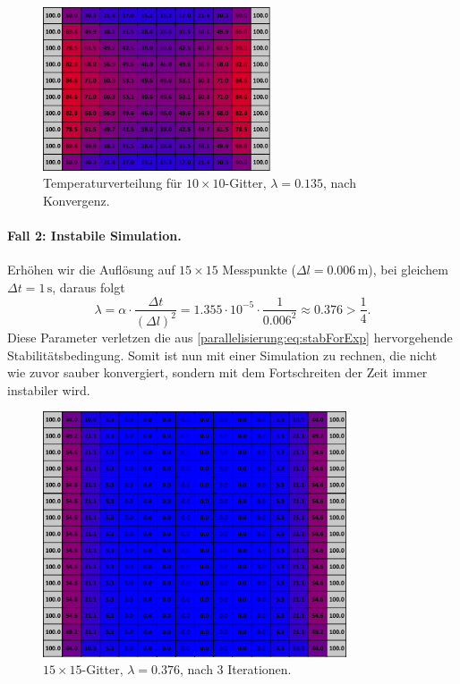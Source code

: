\begin{figure}[htbp]
	\centering
	\includegraphics[width=0.6\textwidth]{papers/parallelisierung/images/simulation_10x10_0.135.pdf}
	\caption{Temperaturverteilung für \(10\times 10\)-Gitter, \(\lambda = 0.135\), nach Konvergenz.}
	\label{parallelisierung:fig:simulation_10x10_0.135}
\end{figure}

\paragraph{Fall 2: Instabile Simulation.}  
Erhöhen wir die Auflösung auf \(15\times 15\) Messpunkte (\(\Delta l = 0.006\,\mathrm{m}\)), bei gleichem \(\Delta t = 1\,\mathrm{s}\), daraus folgt
\[
\lambda =
\alpha \cdot \frac{\Delta t}{(\Delta l)^2}
=
1.355\cdot 10^{-5} \cdot \frac{1}{0.006^2}
\approx 0.376 > \frac14.
\]
Diese Parameter verletzen die aus \eqref{parallelisierung:eq:stabForExp} hervorgehende Stabilitätsbedingung. Somit ist nun mit einer Simulation zu rechnen, die nicht wie zuvor sauber konvergiert, sondern mit dem Fortschreiten der Zeit immer instabiler wird.

\begin{figure}[htbp]
	\centering
	\includegraphics[width=0.8\textwidth]{papers/parallelisierung/images/simulation_15x15_0.376_3it.pdf}
	\caption{\(15\times 15\)-Gitter, \(\lambda = 0.376\), nach 3 Iterationen.}
	\label{parallelisierung:fig:simulation_15x15_0.376_3it}
\end{figure}

